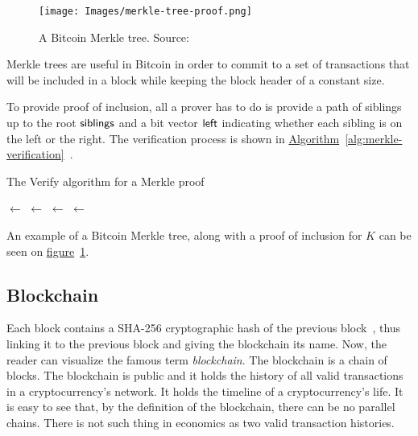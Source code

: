 \begin{figure}[ht]
  \centering
  \texttt{[image: Images/merkle-tree-proof.png]}
  \caption{A Bitcoin Merkle tree. Source:~\cite{mastering}}
  \label{fig:merkletree}
\end{figure}
\vspace{0.3cm}

Merkle trees are useful in Bitcoin in order to commit to a set of transactions that will be included in a block while keeping the block header of a constant size.

To provide proof of inclusion, all a prover has to do is provide a path of siblings up to the root $\sf{siblings}$ and a bit vector $\sf{left}$ indicating whether each sibling is on the left or the right. The verification process is shown in \hyperref[alg:merkle-verification]{Algorithm}~\ref{alg:merkle-verification}~\cite{gtklocker}.
\vspace{0.3cm}
\begin{algorithm}
  \caption{\label{alg:merkle-verification}The \textsf{Verify} algorithm
    for a Merkle proof}
    \begin{algorithmic}[1]
            \State {} $\gets$ 
              \State {} $\gets$ 
                \State {} $\gets$ 
              \Else
                \State {} $\gets$ 
              \EndIf
            \EndWhile
            \State{}
        \EndFunction
    \end{algorithmic}
\end{algorithm}
\vspace{0.3cm}

An example of a Bitcoin Merkle tree, along with a proof of inclusion for $K$ can be seen on \hyperref[fig:merkletree]{figure}~\ref{fig:merkletree}.

\subsection{Blockchain} \label{sec:blockchain}
Each block contains a SHA-256 cryptographic hash of the previous block~\cite{economist}, thus linking it to the previous block and giving the blockchain its name. Now, the reader can visualize the famous term \emph{blockchain}. The blockchain is a chain of blocks. The blockchain is public and it holds the history of all valid transactions in a cryptocurrency's network. It holds the timeline of a cryptocurrency's life. It is easy to see that, by the definition of the blockchain, there can be no parallel chains. There is not such thing in economics as two valid transaction histories.

